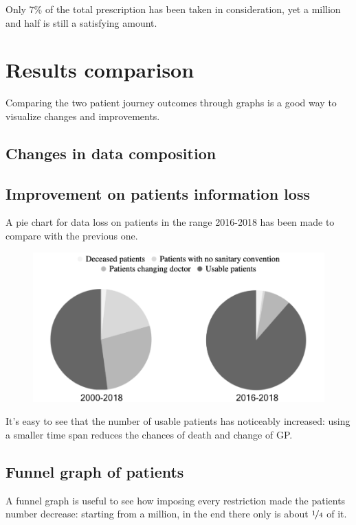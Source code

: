 Only 7\% of the total prescription has been taken in consideration, yet a million and half is still a satisfying amount.

\section{Results comparison}
Comparing the two patient journey outcomes through graphs is a good way to visualize changes and improvements.

\subsection{Changes in data composition}

\subsection{Improvement on patients information loss}
A pie chart for data loss on patients in the range 2016-2018 has been made to compare with the previous one.

\begin{figure}[h]
	\centering
	\includegraphics[scale=0.5]{images/pies.png}
\end{figure}

It's easy to see that the number of usable patients has noticeably increased: using a smaller time span reduces the chances of death and change of GP.

\subsection{Funnel graph of patients}
A funnel graph is useful to see how imposing every restriction made the patients number decrease: starting from a million, in the end there only is about $\nicefrac{1}{4}$ of it.








